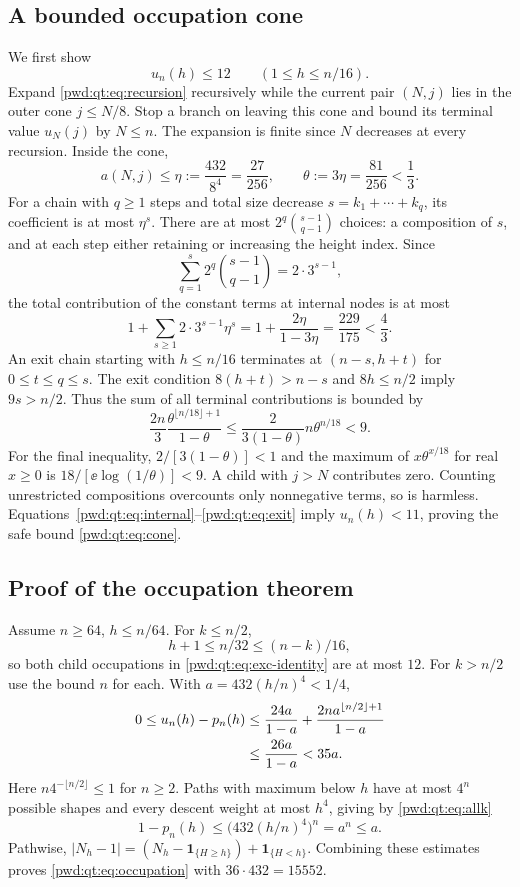 \documentclass[11pt,letterpaper]{article}
\numberwithin{equation}{section}
\theoremstyle{remark}\newtheorem{remark}[theorem]{Remark}
\begin{document}
\subsection{A bounded occupation cone}
We first show
\begin{equation}\label{pwd:qt:eq:cone}
 u_n(h)\le12\qquad(1\le h\le n/16).
\end{equation}
Expand \eqref{pwd:qt:eq:recursion} recursively while the current pair $(N,j)$ lies in the outer cone $j\le N/8$. Stop a branch on leaving this cone and bound its terminal value $u_N(j)$ by $N\le n$. The expansion is finite since $N$ decreases at every recursion. Inside the cone,
\[
 a(N,j)\le\eta:=\frac{432}{8^4}=\frac{27}{256},\qquad
 \theta:=3\eta=\frac{81}{256}<\frac13.
\]
For a chain with $q\ge1$ steps and total size decrease $s=k_1+\cdots+k_q$, its coefficient is at most $\eta^s$. There are at most $2^q\binom{s-1}{q-1}$ choices: a composition of $s$, and at each step either retaining or increasing the height index. Since
\[
 \sum_{q=1}^s2^q\binom{s-1}{q-1}=2\cdot3^{s-1},
\]
the total contribution of the constant terms at internal nodes is at most
\begin{equation}\label{pwd:qt:eq:internal}
 1+\sum_{s\ge1}2\cdot3^{s-1}\eta^s
   =1+\frac{2\eta}{1-3\eta}=\frac{229}{175}<\frac43.
\end{equation}
An exit chain starting with $h\le n/16$ terminates at $(n-s,h+t)$ for $0\le t\le q\le s$. The exit condition $8(h+t)>n-s$ and $8h\le n/2$ imply $9s>n/2$. Thus the sum of all terminal contributions is bounded by
\begin{equation}\label{pwd:qt:eq:exit}
 \frac{2n}{3}\frac{\theta^{\lfloor n/18\rfloor+1}}{1-\theta}
 \le\frac{2}{3(1-\theta)}n\theta^{n/18}<9.
\end{equation}
For the final inequality, $2/[3(1-\theta)]<1$ and the maximum of $x\theta^{x/18}$ for real $x\ge0$ is $18/[\ee\log(1/\theta)]<9$. A child with $j>N$ contributes zero. Counting unrestricted compositions overcounts only nonnegative terms, so is harmless. Equations~\eqref{pwd:qt:eq:internal}--\eqref{pwd:qt:eq:exit} imply $u_n(h)<11$, proving the safe bound \eqref{pwd:qt:eq:cone}.

\subsection{Proof of the occupation theorem}
Assume $n\ge64$, $h\le n/64$. For $k\le n/2$,
\[
 h+1\le n/32\le(n-k)/16,
\]
so both child occupations in \eqref{pwd:qt:eq:exc-identity} are at most $12$. For $k>n/2$ use the bound $n$ for each. With $a=432(h/n)^4<1/4$,
\begin{align}\label{pwd:qt:eq:occupation-excess}
 0\le u_n(h)-p_n(h)
 &\le\frac{24a}{1-a}+\frac{2na^{\lfloor n/2\rfloor+1}}{1-a}\notag\\
 &\le\frac{26a}{1-a}<35a.
\end{align}
Here $n4^{-\lfloor n/2\rfloor}\le1$ for $n\ge2$. Paths with maximum below $h$ have at most $4^n$ possible shapes and every descent weight at most $h^4$, giving by \eqref{pwd:qt:eq:allk}
\[
 1-p_n(h)\le\bigl(432(h/n)^4\bigr)^n=a^n\le a.
\]
Pathwise,
$|N_h-1|=(N_h-\mathbf1_{\{H\ge h\}})+\mathbf1_{\{H<h\}}$.
Combining these estimates proves \eqref{pwd:qt:eq:occupation} with $36\cdot432=15552$.
\end{document}

